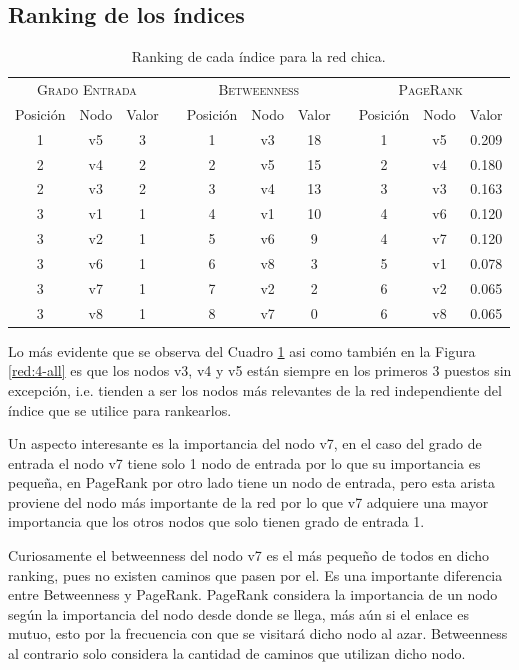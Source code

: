 \documentclass[letterpaper]{article}
\begin{document}
\subsection{Ranking de los índices}
\begin{table}[H]
  \centering
  \renewcommand{\arraystretch}{1.1}
  \begin{tabular}{@{}ccccccccccc@{}}
    \toprule
       \multicolumn{3}{c}{\textsc{Grado Entrada}} & \phantom{abc} & \multicolumn{3}{c}{\textsc{Betweenness}} & \phantom{abc} & \multicolumn{3}{c}{\textsc{PageRank}}\\
       \cmidrule{1-3}\cmidrule{5-7}\cmidrule{9-11}
       Posición & Nodo & Valor & & Posición & Nodo & Valor & & Posición & Nodo & Valor\\
       \midrule
      1 & v5 & 3 &&  1 & v3 & 18 && 1 & v5 & 0.209 \\
      2 & v4 & 2 &&  2 & v5 & 15 && 2 & v4 & 0.180 \\
      2 & v3 & 2 &&  3 & v4 & 13 && 3 & v3 & 0.163 \\
      3 & v1 & 1 &&  4 & v1 & 10 && 4 & v6 & 0.120 \\
      3 & v2 & 1 &&  5 & v6 & 9  && 4 & v7 & 0.120 \\
      3 & v6 & 1 &&  6 & v8 & 3  && 5 & v1 & 0.078 \\
      3 & v7 & 1 &&  7 & v2 & 2  && 6 & v2 & 0.065 \\
      3 & v8 & 1 &&  8 & v7 & 0  && 6 & v8 & 0.065 \\
    \bottomrule
  \end{tabular}
  \caption{Ranking de cada índice para la red chica.}
  \label{table:1}
\end{table}
Lo más evidente que se observa del Cuadro \ref{table:1} asi como también en la Figura \ref{red:4-all} es que los nodos v3, v4 y v5 están siempre en los primeros 3 puestos sin excepción, i.e. tienden a ser los nodos más relevantes de la red independiente del índice que se utilice para rankearlos.

Un aspecto interesante es la importancia del nodo v7, en el caso del grado de entrada el nodo v7 tiene solo 1 nodo de entrada por lo que su importancia es pequeña, en PageRank por otro lado tiene un nodo de entrada, pero esta arista proviene del nodo más importante de la red por lo que v7 adquiere una mayor importancia que los otros nodos que solo tienen grado de entrada 1.

Curiosamente el betweenness del nodo v7 es el más pequeño de todos en dicho ranking, pues no existen caminos que pasen por el. Es una importante diferencia entre Betweenness y PageRank. PageRank considera la importancia de un nodo según la importancia del nodo desde donde se llega, más aún si el enlace es mutuo, esto por la frecuencia con que se visitará dicho nodo al azar. Betweenness al contrario solo considera la cantidad de caminos que utilizan dicho nodo.
\end{document}
